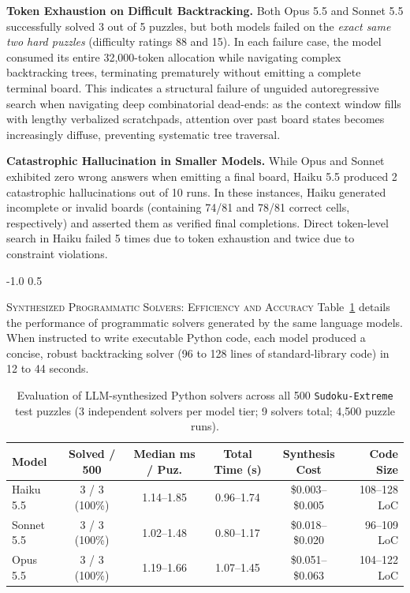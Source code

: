 \documentclass{article} %
\makeatletter
\renewcommand{\subsection}{\@startsection{subsection}{2}{\z@}%
  {-1.0\baselineskip}%
  {0.5\baselineskip}%
  {\normalfont\fontsize{10pt}{12pt}\selectfont\scshape\raggedright}}
\makeatother
\begin{document}
\textbf{Token Exhaustion on Difficult Backtracking.} Both Opus 5.5 and Sonnet 5.5 successfully solved 3 out of 5 puzzles, but both models failed on the \textit{exact same two hard puzzles} (difficulty ratings 88 and 15). In each failure case, the model consumed its entire 32,000-token allocation while navigating complex backtracking trees, terminating prematurely without emitting a complete terminal board. This indicates a structural failure of unguided autoregressive search when navigating deep combinatorial dead-ends: as the context window fills with lengthy verbalized scratchpads, attention over past board states becomes increasingly diffuse, preventing systematic tree traversal.

\textbf{Catastrophic Hallucination in Smaller Models.} While Opus and Sonnet exhibited zero wrong answers when emitting a final board, Haiku 5.5 produced 2 catastrophic hallucinations out of 10 runs. In these instances, Haiku generated incomplete or invalid boards (containing 74/81 and 78/81 correct cells, respectively) and asserted them as verified final completions. Direct token-level search in Haiku failed 5 times due to token exhaustion and twice due to constraint violations.

\subsection{\textsc{Synthesized Programmatic Solvers: Efficiency and Accuracy}}
Table~\ref{tab:code_synthesis} details the performance of programmatic solvers generated by the same language models. When instructed to write executable Python code, each model produced a concise, robust backtracking solver (96 to 128 lines of standard-library code) in 12 to 44 seconds.

\begin{table}[t]
\caption{Evaluation of LLM-synthesized Python solvers across all 500 \texttt{Sudoku-Extreme} test puzzles (3 independent solvers per model tier; 9 solvers total; 4,500 puzzle runs).}
\label{tab:code_synthesis}
\begin{center}
\begin{tabular}{lccccr}
\toprule
\textbf{Model} & \textbf{Solved / 500} & \textbf{Median ms / Puz.} & \textbf{Total Time (s)} & \textbf{Synthesis Cost} & \textbf{Code Size} \\
\midrule
Haiku 5.5  & 3 / 3 (100\%) & 1.14--1.85 & 0.96--1.74 & \$0.003--\$0.005 & 108--128 LoC \\
Sonnet 5.5 & 3 / 3 (100\%) & 1.02--1.48 & 0.80--1.17 & \$0.018--\$0.020 & 96--109 LoC \\
Opus 5.5   & 3 / 3 (100\%) & 1.19--1.66 & 1.07--1.45 & \$0.051--\$0.063 & 104--122 LoC \\
\bottomrule
\end{tabular}
\end{center}
\end{table}
\end{document}
